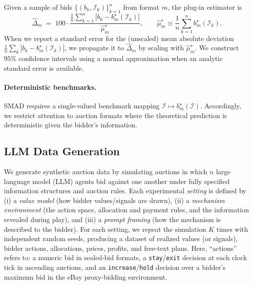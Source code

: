 Given a sample of bids $\{(b_k,\mathcal I_k)\}_{k=1}^n$ from format $m$, the plug-in estimator is
\[
\widehat{\Delta}_m
\;=\;
100 \cdot
\frac{\frac{1}{n}\sum_{k=1}^{n}\left|b_k-b_m^\star(\mathcal I_k)\right|}
{\widehat{\mu}_m^\star},
\qquad
\widehat{\mu}_m^\star \equiv \frac{1}{n}\sum_{k=1}^{n} b_m^\star(\mathcal I_k).
\]
When we report a standard error for the (unscaled) mean absolute deviation $\frac{1}{n}\sum_k |b_k-b_m^\star(\mathcal I_k)|$, we propagate it to $\widehat{\Delta}_m$ by scaling with $\widehat{\mu}_m^\star$. We construct $95\%$ confidence intervals using a normal approximation when an analytic standard error is available.


\paragraph{Deterministic benchmarks.}
SMAD requires a single-valued benchmark mapping $\mathcal I \mapsto b_m^\star(\mathcal I)$.
Accordingly, we restrict attention to auction formats where the theoretical prediction is deterministic given the bidder’s information.


\subsection{LLM Data Generation}
\label{sec:data_generation}

We generate synthetic auction data by simulating auctions in which $n$ large language model (LLM) agents bid against one another under fully specified information structures and auction rules. Each experimental \emph{setting} is defined by (i) a \emph{value model} (how bidder values/signals are drawn), (ii) a \emph{mechanism environment} (the action space, allocation and payment rules, and the information revealed during play), and (iii) a \emph{prompt framing} (how the mechanism is described to the bidder). For each setting, we repeat the simulation $K$ times with independent random seeds, producing a dataset of realized values (or signals), bidder actions, allocations, prices, profits, and free-text plans. Here, ``actions'' refers to: a numeric bid in sealed-bid formats, a \texttt{stay}/\texttt{exit} decision at each clock tick in ascending auctions, and an \texttt{increase}/\texttt{hold} decision over a bidder's maximum bid in the eBay proxy-bidding environment.

